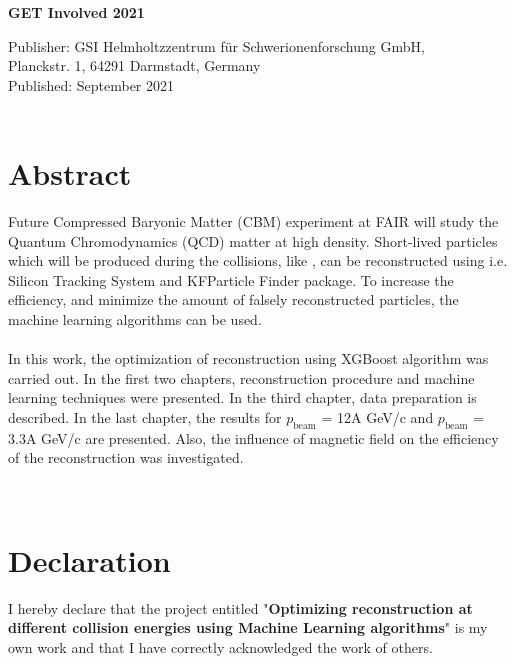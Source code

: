 \documentclass[12pt,a4paper]{report}
\begin{document}
\noindent\textbf{GET Involved 2021}\\
\vspace{0.8cm}

\noindent Publisher: GSI Helmholtzzentrum f\"{u}r Schwerionenforschung GmbH,\\
Planckstr. 1, 64291 Darmstadt, Germany\\
Published: September 2021\\


\newpage
~ %
\thispagestyle{empty}
\newpage

\setcounter{page}{1}
\section*{Abstract}
Future Compressed Baryonic Matter (CBM) experiment at FAIR will study the Quantum Chromodynamics (QCD) matter at high density. Short-lived particles which will be produced during the collisions, like \PKshort, can be reconstructed using i.e. Silicon Tracking System and KFParticle Finder package. To increase the efficiency, and minimize the amount of falsely reconstructed particles, the machine learning algorithms can be used.\\\\
In this work, the optimization of \PKshort reconstruction using XGBoost algorithm was carried out. In the first two chapters, reconstruction procedure and machine learning techniques were presented. In the third chapter, data preparation is described. In the last chapter, the results for $p_{\text{beam}}$ = 12A GeV/c and $p_{\text{beam}}$ = 3.3A GeV/c are presented. Also, the influence of magnetic field on the efficiency of the reconstruction was investigated.




\newpage
~ %
\newpage
\section*{Declaration}
I hereby declare that the project entitled "\textbf{Optimizing \PKshort reconstruction at different collision energies using Machine Learning algorithms}" is my own work and that I have correctly acknowledged the work of others.
\newpage
~ %
\newpage
\end{document}
